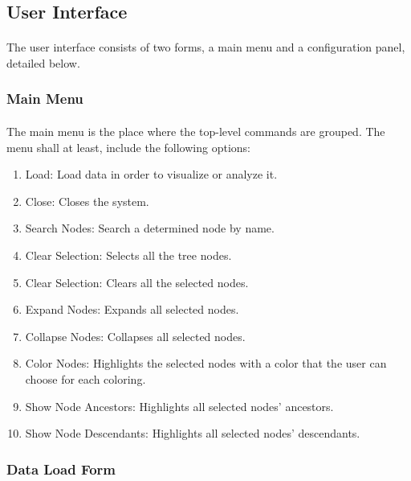 \documentclass[10pt,a4paper]{article}
\begin{document}
\paragraph{}

\subsection{User Interface}
\paragraph{}
The user interface consists of two forms, a main menu and a configuration panel, detailed below.

\subsubsection{Main Menu}
\paragraph{}
The main menu is the place where the top-level commands are grouped. The menu shall at least, include the following options:
\begin{enumerate}
    \item{Load: }
	Load data in order to visualize or analyze it.
    \item{Close: }
	Closes the system.
    \item{Search Nodes: }
	Search a determined node by name.
\item{Clear Selection: }
	Selects all the tree nodes.
\item{Clear Selection: }
	Clears all the selected nodes.
\item{Expand Nodes: }
	Expands all selected nodes.
\item{Collapse Nodes: }
	Collapses all selected nodes.
\item{Color Nodes: }
	Highlights the selected nodes with a color that the user can choose for each coloring.
\item{Show Node Ancestors: }
	Highlights all selected nodes' ancestors.
\item{Show Node Descendants: }
	Highlights all selected nodes' descendants.

\end{enumerate}

\subsubsection{Data Load Form}
\end{document}
